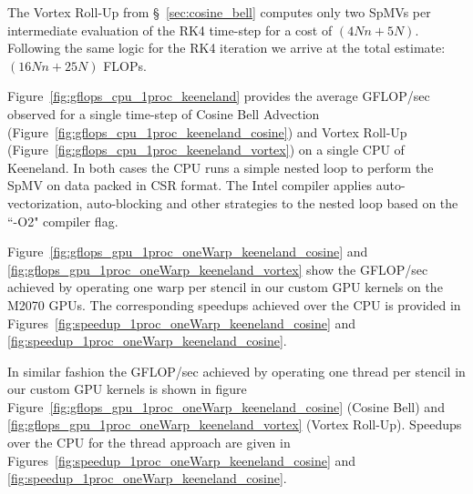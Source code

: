 The Vortex Roll-Up from \S~\ref{sec:cosine_bell} computes only two SpMVs per intermediate evaluation of the RK4 time-step for a cost of $(4Nn + 5N)$. Following the same logic for the RK4 iteration we arrive at the total estimate: $(16Nn + 25N)$ FLOPs. 

Figure~\ref{fig:gflops_cpu_1proc_keeneland} provides the average GFLOP/sec observed for a single time-step of Cosine Bell Advection (Figure~\ref{fig:gflops_cpu_1proc_keeneland_cosine}) and Vortex Roll-Up (Figure~\ref{fig:gflops_cpu_1proc_keeneland_vortex}) on a single CPU of Keeneland. In both cases the CPU runs a simple nested loop to perform the SpMV on data packed in CSR format. The Intel compiler applies auto-vectorization, auto-blocking and other strategies to the nested loop based on the ``-O2" compiler flag. 

Figure~\ref{fig:gflops_gpu_1proc_oneWarp_keeneland_cosine} and \ref{fig:gflops_gpu_1proc_oneWarp_keeneland_vortex} show the GFLOP/sec achieved by operating one warp per stencil in our custom GPU kernels on the M2070 GPUs. The corresponding speedups achieved over the CPU is provided in Figures~\ref{fig:speedup_1proc_oneWarp_keeneland_cosine} and \ref{fig:speedup_1proc_oneWarp_keeneland_cosine}. 

In similar fashion the GFLOP/sec achieved by operating one thread per stencil in our custom GPU kernels is shown in figure Figure~\ref{fig:gflops_gpu_1proc_oneWarp_keeneland_cosine} (Cosine Bell) and \ref{fig:gflops_gpu_1proc_oneWarp_keeneland_vortex} (Vortex Roll-Up). Speedups over the CPU for the thread approach are given in Figures~\ref{fig:speedup_1proc_oneWarp_keeneland_cosine} and \ref{fig:speedup_1proc_oneWarp_keeneland_cosine}. 

